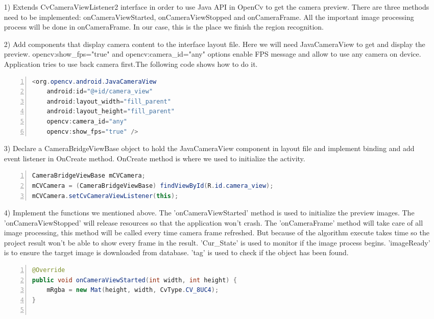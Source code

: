 \begin{enumerate}
\item[1)] Extends CvCameraViewListener2 interface in order to use Java API in OpenCv to get the camera preview. There are three methods need to be implemented: onCameraViewStarted, onCameraViewStopped and onCameraFrame. All the important image processing process will be done in onCameraFrame. In our case, this is the place we finish the region recognition.
\item[2)] Add components that display camera content to the interface layout file. Here we will need JavaCameraView to get and display the preview. opencv:show\_fps="true" and opencv:camera\_id="any" options enable FPS message and allow to use any camera on device. Application tries to use back camera first.The following code shows how to do it.
\begin{lstlisting}[language={java},
        numbers=left,basicstyle=\small\ttfamily,breaklines=true] 
<org.opencv.android.JavaCameraView
    android:id="@+id/camera_view"
    android:layout_width="fill_parent"
    android:layout_height="fill_parent"
    opencv:camera_id="any"
    opencv:show_fps="true" />
\end{lstlisting}
\item[3)] Declare a CameraBridgeViewBase object to hold the JavaCameraView component in layout file and implement binding and add event listener in OnCreate method. OnCreate method is where we used to initialize the activity.
\begin{lstlisting}[language={java},
        numbers=left,basicstyle=\small\ttfamily,breaklines=true] 
CameraBridgeViewBase mCVCamera;
mCVCamera = (CameraBridgeViewBase) findViewById(R.id.camera_view);
mCVCamera.setCvCameraViewListener(this);
\end{lstlisting}
\item[4)] Implement the functions we mentioned above. The 'onCameraViewStarted' method is used to initialize the preview images. The 'onCameraViewStopped' will release resources so that the application won't crash. The 'onCameraFrame' method will take care of all image processing, this method will be called every time camera frame refreshed. But because of the algorithm execute takes time so the project result won't be able to show every frame in the result. 'Cur\_State' is used to monitor if the image process begins. 'imageReady' is to ensure the target image is downloaded from database. 'tag' is used to check if the object has been found.
\begin{lstlisting}[language={java},
        numbers=left,basicstyle=\small\ttfamily,breaklines=true] 
@Override
public void onCameraViewStarted(int width, int height) {
    mRgba = new Mat(height, width, CvType.CV_8UC4);
}


\end{lstlisting}
\end{enumerate}
